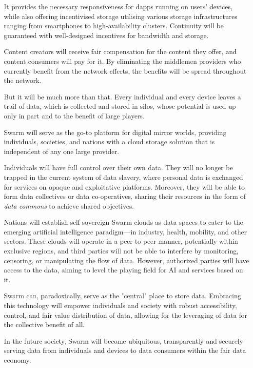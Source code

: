It provides the necessary responsiveness for dapps running on users' devices, while also offering incentivised storage utilising various storage infrastructures ranging from smartphones to high-availability clusters. Continuity will be guaranteed with well-designed incentives for bandwidth and storage.

Content creators will receive fair compensation for the content they offer, and content consumers will pay for it. By eliminating the middlemen providers who currently benefit from the network effects, the benefits will be spread throughout the network.

But it will be much more than that. Every individual and every device leaves a trail of data, which is collected and stored in silos, whose potential is used up only in part and to the benefit of large players.

Swarm will serve as the go-to platform for digital mirror worlds, providing individuals, societies, and nations with a cloud storage solution that is independent of any one large provider. 


Individuals will have full control over their own data. They will no longer be trapped in the current system of data slavery, where personal data is exchanged for services on opaque and exploitative platforms. Moreover, they will be able to form data collectives or data co-operatives, sharing their resources in the form of \emph{data commons} to achieve shared objectives. 

Nations will establish self-sovereign Swarm clouds as data spaces to cater to the emerging artificial intelligence paradigm—in industry, health, mobility, and other sectors. These clouds will operate in a peer-to-peer manner, potentially within exclusive regions, and third parties will not be able to interfere by monitoring, censoring, or manipulating the flow of data. However, authorized parties will have access to the data, aiming to level the playing field for AI and services based on it.  

Swarm can, paradoxically, serve as the "central" place to store data. Embracing this technology will empower individuals and society with robust accessibility, control, and fair value distribution of data, allowing for the leveraging of data for the collective benefit of all.

In the future society, Swarm will become ubiquitous, transparently and securely serving data from individuals and devices to data consumers within the fair data economy.


